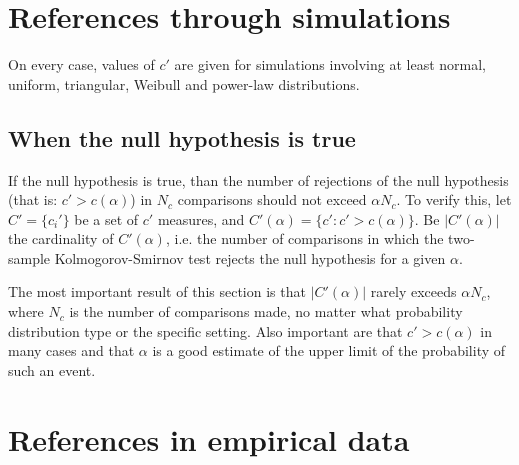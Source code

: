 \documentclass[%
	aip,
	jmp,%
	amsmath,amssymb,
	reprint,%
]{revtex4-1}
\begin{document}
\section{References through simulations}\label{sec:simulations}
On every case, values of $c'$ are given for simulations involving
at least normal, uniform, triangular, Weibull and power-law distributions.

\subsection{When the null hypothesis is true}
If the null hypothesis is true, than the number
of rejections of the null hypothesis (that is: $c'>c(\alpha)$)
in $N_c$ comparisons should not exceed $\alpha N_c$.
To verify this, let $C'=\{c_i'\}$ be a set of $c'$ measures,
and $C'(\alpha)=\{c' : c'>c(\alpha)\}$.
Be $|C'(\alpha)|$ the cardinality of $C'(\alpha)$,
i.e. the number of comparisons in which the two-sample Kolmogorov-Smirnov
test rejects the null hypothesis for a given $\alpha$.

The most important result of this section is that
$|C'(\alpha)|$ rarely exceeds $\alpha N_c$,
 where $N_c$ is the number of comparisons made,
no matter what probability distribution type
or the specific setting.
Also important are that
$c'>c(\alpha)$ in many cases
and that $\alpha$ is a good estimate of the upper limit of the probability
of such an event.


\section{References in empirical data}\label{sec:empirical}
\end{document}
